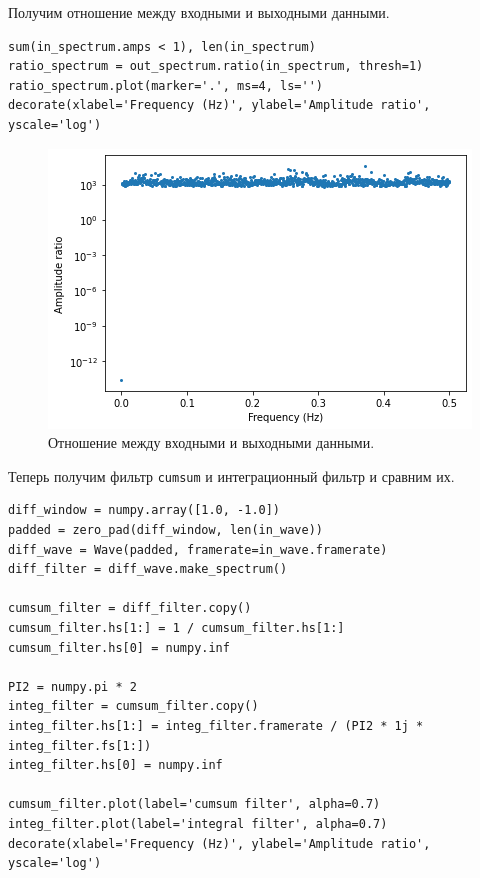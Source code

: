 \documentclass[a4paper, 14pt]{extarticle}
\begin{document}
    Получим отношение между входными и выходными данными.

    \begin{lstlisting}[caption= Получение отношения между входными и выходными данными., label={lst:task1_out_spectrum}]
sum(in_spectrum.amps < 1), len(in_spectrum)
ratio_spectrum = out_spectrum.ratio(in_spectrum, thresh=1)
ratio_spectrum.plot(marker='.', ms=4, ls='')
decorate(xlabel='Frequency (Hz)', ylabel='Amplitude ratio', yscale='log')  \end{lstlisting}

    \begin{figure}[H]
        \centering
        \includegraphics[width=0.7\linewidth]{resources/Images/task1_ratio_spectrum}
        \caption{Отношение между входными и выходными данными.}
        \label{fig:task1_out_spectrum}
    \end{figure}

    Теперь получим фильтр \texttt{cumsum} и интеграционный фильтр и сравним их.

    \begin{lstlisting}[caption= Вычисление фильтра \texttt{cumsum} и интеграционного фильтра., label={lst:task1_cumsum_integ_filters}]
diff_window = numpy.array([1.0, -1.0])
padded = zero_pad(diff_window, len(in_wave))
diff_wave = Wave(padded, framerate=in_wave.framerate)
diff_filter = diff_wave.make_spectrum()

cumsum_filter = diff_filter.copy()
cumsum_filter.hs[1:] = 1 / cumsum_filter.hs[1:]
cumsum_filter.hs[0] = numpy.inf

PI2 = numpy.pi * 2
integ_filter = cumsum_filter.copy()
integ_filter.hs[1:] = integ_filter.framerate / (PI2 * 1j * integ_filter.fs[1:])
integ_filter.hs[0] = numpy.inf

cumsum_filter.plot(label='cumsum filter', alpha=0.7)
integ_filter.plot(label='integral filter', alpha=0.7)
decorate(xlabel='Frequency (Hz)', ylabel='Amplitude ratio', yscale='log')  \end{lstlisting}
\end{document}
